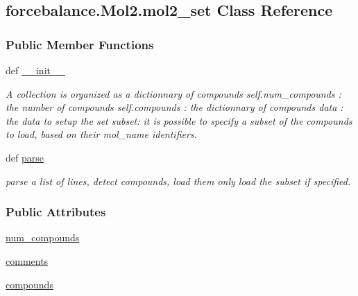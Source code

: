 \hypertarget{classforcebalance_1_1Mol2_1_1mol2__set}{\subsection{forcebalance.\-Mol2.\-mol2\-\_\-set Class Reference}
\label{classforcebalance_1_1Mol2_1_1mol2__set}
}
\subsubsection*{Public Member Functions}
\begin{DoxyCompactItemize}
\item 
def \hyperlink{classforcebalance_1_1Mol2_1_1mol2__set_a206a3129cfa4ef6fb5982bbe536ffef9}{\-\_\-\-\_\-init\-\_\-\-\_\-}
\begin{DoxyCompactList}\small\item\em A collection is organized as a dictionnary of compounds self.\-num\-\_\-compounds \-: the number of compounds self.\-compounds \-: the dictionnary of compounds data \-: the data to setup the set subset\-: it is possible to specify a subset of the compounds to load, based on their mol\-\_\-name identifiers. \end{DoxyCompactList}\item 
def \hyperlink{classforcebalance_1_1Mol2_1_1mol2__set_ada065630fbb80124e21e04a1622c9c74}{parse}
\begin{DoxyCompactList}\small\item\em parse a list of lines, detect compounds, load them only load the subset if specified. \end{DoxyCompactList}\end{DoxyCompactItemize}
\subsubsection*{Public Attributes}
\begin{DoxyCompactItemize}
\item 
\hyperlink{classforcebalance_1_1Mol2_1_1mol2__set_a28293992817a955b56a9f67163058055}{num\-\_\-compounds}
\item 
\hyperlink{classforcebalance_1_1Mol2_1_1mol2__set_a3350ea7130a203f09c7435e56ad9de1e}{comments}
\item 
\hyperlink{classforcebalance_1_1Mol2_1_1mol2__set_a4fbc5085335a18400b9cdf32090e5643}{compounds}
\end{DoxyCompactItemize}


